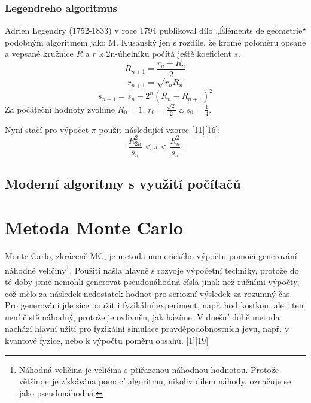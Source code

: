 \documentclass[rocnikovka]{gzwroc} %
\begin{document}
\subsubsection{Legendreho algoritmus}
Adrien Legendry (1752-1833) v roce 1794 publikoval dílo „Éléments de géométrie“ podobným algoritmem jako M. Kusánský jen s rozdíle, že kromě poloměru opsané a vepsané kružnice $R$ a $r$ k 2n-úhelníku počítá ještě koeficient $s$.
\begin{equation}
R_{n+1}=\frac{r_n+R_n}{2}
\end{equation}
\begin{equation}
r_{n+1}=\sqrt{r_nR_n}
\end{equation}
\begin{equation}
s_{n+1}=s_n-2^n(R_n-R_{n+1})^2
\end{equation}
Za počáteční hodnoty zvolíme $R_0=1$, $r_0=\frac{\sqrt{2}}{2}$ a $s_0=\frac{1}{4}$.

Nyní stačí pro výpočet $\pi$ použít následující vzorec [11][16]:
\begin{equation}
\frac{R_{2n}^2}{s_n}<\pi<\frac{R_n^2}{s_n}.
\end{equation}
\subsection{Moderní algoritmy s využití počítačů}

\section{Metoda Monte Carlo}
Monte Carlo, zkráceně MC, je metoda numerického výpočtu pomocí generování náhodné veličiny\footnote[4]{Náhodná veličina je veličina s přiřazenou náhodnou hodnotou. Protože většinou je získávána pomocí algoritmu, nikoliv dílem náhody, označuje se jako pseudonáhodná.}. Použití našla hlavně s rozvoje výpočetní techniky, protože do té doby jsme nemohli generovat pseudonáhodná čísla jinak než ručními výpočty, což mělo za následek nedostatek hodnot pro seriozní výsledek za rozumný čas. Pro generování jde sice použít i fyzikální experiment, např. hod kostkou, ale i ten není čistě náhodný, protože je ovlivněn, jak házíme. V dnešní době metoda nachází hlavní užití pro fyzikální simulace pravděpodobnostních jevu, např. v kvantové fyzice, nebo k výpočtu poměru obsahů. [1][19]
\end{document}
